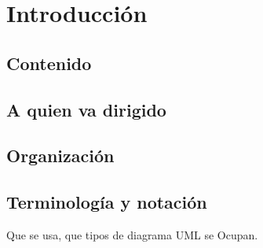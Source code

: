 \chapter{Introducción} 

\section{Contenido}

\section{A quien va dirigido}

\section{Organización}

\section{Terminología y notación}
Que se usa, que tipos de diagrama UML se Ocupan.


